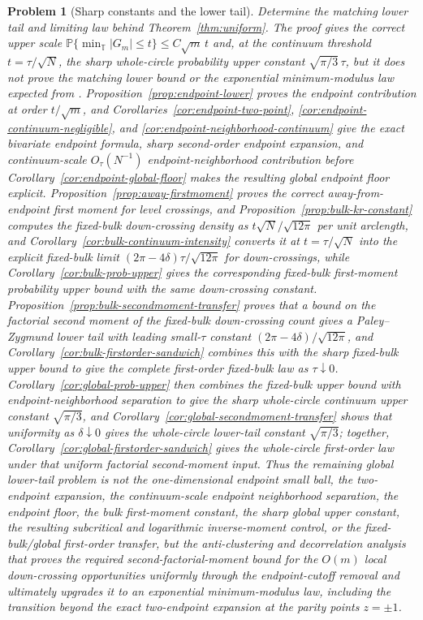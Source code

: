 \documentclass[11pt]{amsart}
\numberwithin{equation}{section}
\newtheorem{problem}[theorem]{Problem}
\theoremstyle{definition}
\theoremstyle{remark}
\newcommand{\T}{\mathbb T}
\newcommand{\Prob}{\mathbb P}
\newcommand{\abs}[1]{\left\lvert #1\right\rvert}
\begin{document}
\begin{problem}[Sharp constants and the lower tail]\label{prob:sharp-boundary}
Determine the matching lower tail and limiting law behind
Theorem~\ref{thm:uniform}.  The proof gives the correct upper scale
\(\Prob\{\min_{\T}\abs{G_m}\le t\}\le C\sqrt m\,t\) and, at the continuum
threshold \(t=\tau/\sqrt N\), the sharp whole-circle probability upper constant
\(\sqrt{\pi/3}\,\tau\), but it does not prove the matching lower bound or the
exponential minimum-modulus law expected from
\cite{YakirZeitouni,CookNguyen}.  Proposition~\ref{prop:endpoint-lower} proves
the endpoint contribution at order \(t/\sqrt m\), and
Corollaries~\ref{cor:endpoint-two-point},
\ref{cor:endpoint-continuum-negligible}, and
\ref{cor:endpoint-neighborhood-continuum} give the exact bivariate endpoint
formula, sharp second-order endpoint expansion, and continuum-scale
\(O_\tau(N^{-1})\) endpoint-neighborhood contribution before
Corollary~\ref{cor:endpoint-global-floor} makes the resulting global endpoint
floor explicit.  Proposition~\ref{prop:away-firstmoment}
proves the correct away-from-endpoint first moment for level crossings, and
Proposition~\ref{prop:bulk-kr-constant} computes the fixed-bulk down-crossing
density as \(t\sqrt N/\sqrt{12\pi}\) per unit arclength, and
Corollary~\ref{cor:bulk-continuum-intensity} converts it at
\(t=\tau/\sqrt N\) into the explicit fixed-bulk limit
\((2\pi-4\delta)\tau/\sqrt{12\pi}\) for down-crossings, while
Corollary~\ref{cor:bulk-prob-upper} gives the corresponding fixed-bulk
first-moment probability upper bound with the same down-crossing constant.
Proposition~\ref{prop:bulk-secondmoment-transfer} proves that a bound on the
factorial second moment of the fixed-bulk down-crossing count gives a
Paley--Zygmund lower tail with leading small-\(\tau\) constant
\((2\pi-4\delta)/\sqrt{12\pi}\), and
Corollary~\ref{cor:bulk-firstorder-sandwich} combines this with the sharp
fixed-bulk upper bound to give the complete first-order fixed-bulk law as
\(\tau\downarrow0\).  Corollary~\ref{cor:global-prob-upper} then combines the
fixed-bulk upper bound with endpoint-neighborhood separation to give the sharp
whole-circle continuum upper constant \(\sqrt{\pi/3}\), and
Corollary~\ref{cor:global-secondmoment-transfer} shows that uniformity as
\(\delta\downarrow0\) gives the whole-circle lower-tail constant
\(\sqrt{\pi/3}\); together, Corollary~\ref{cor:global-firstorder-sandwich}
gives the whole-circle first-order law under that uniform factorial
second-moment input.  Thus
the remaining global lower-tail problem is not the one-dimensional endpoint
small ball, the two-endpoint expansion, the continuum-scale endpoint
neighborhood separation, the endpoint floor, the bulk first-moment constant, the
sharp global upper constant, the resulting subcritical and logarithmic
inverse-moment control,
or the fixed-bulk/global first-order transfer, but the anti-clustering and
decorrelation analysis that proves the required second-factorial-moment bound
for the \(O(m)\) local down-crossing opportunities uniformly through the
endpoint-cutoff removal and ultimately upgrades it to an exponential
minimum-modulus law, including the transition beyond the exact two-endpoint
expansion at the parity points \(z=\pm1\).
\end{problem}
\end{document}
